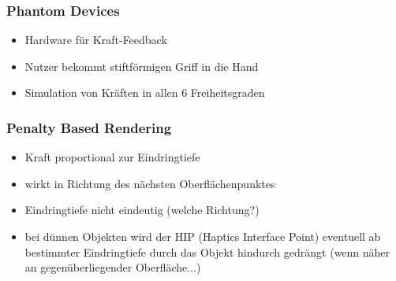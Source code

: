 \documentclass[a4paper, 12pt]{article}
\begin{document}
\subsubsection*{Phantom Devices}
\begin{itemize}
  \item Hardware für Kraft-Feedback
  \item Nutzer bekommt stiftförmigen Griff in die Hand
  \item Simulation von Kräften in allen 6 Freiheitsgraden
\end{itemize}

\subsubsection*{Penalty Based Rendering}
\begin{itemize}
  \item Kraft proportional zur Eindringtiefe
  \item wirkt in Richtung des nächsten Oberflächenpunktes
\end{itemize}
\begin{itemize}
  \renewcommand{\labelitemi}{\(-\)}%
  \item Eindringtiefe nicht eindeutig (welche Richtung?)
  \item bei dünnen Objekten wird der HIP (Haptics Interface Point) eventuell ab bestimmter Eindringtiefe durch das Objekt hindurch gedrängt (wenn näher an gegenüberliegender Oberfläche...)
\end{itemize}
\end{document}
